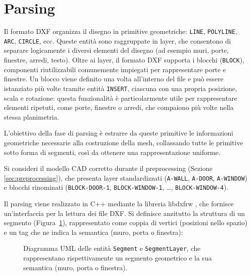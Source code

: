 \section{Parsing}
\label{sec:parsing}

Il formato DXF organizza il disegno in primitive geometriche: \texttt{LINE}, \texttt{POLYLINE}, \texttt{ARC}, \texttt{CIRCLE}, ecc. Queste entità sono raggruppate in layer, che consentono di separare logicamente i diversi elementi del disegno (ad esempio muri, porte, finestre, arredi, testo). Oltre ai layer, il formato DXF supporta i blocchi (\texttt{BLOCK}), componenti riutilizzabili comunemente impiegati per rappresentare porte e finestre. Un blocco viene definito una volta all'interno del file e può essere istanziato più volte tramite entità \texttt{INSERT}, ciascuna con una propria posizione, scala e rotazione: questa funzionalità è particolarmente utile per rappresentare elementi ripetuti, come porte, finestre o arredi, che compaiono più volte nella stessa planimetria.

L'obiettivo della fase di parsing è estrarre da queste primitive le informazioni geometriche necessarie alla costruzione della mesh, collassando tutte le primitive sotto forma di segmenti, così da ottenere una rappresentazione uniforme.

Si consideri il modello CAD corretto durante il preprocessing (Sezione \ref{sec:preprocessing}), che presenta layer standardizzati (\texttt{A-WALL}, \texttt{A-DOOR}, \texttt{A-WINDOW}) e blocchi rinominati (\texttt{BLOCK-DOOR-1}, \texttt{BLOCK-WINDOW-1}, \ldots, \texttt{BLOCK-WINDOW-4}).

Il parsing viene realizzato in C++ mediante la libreria libdxfrw \cite{libdxfrw}, che fornisce un'interfaccia per la lettura dei file DXF. Si definisce anzitutto la struttura di un segmento (Figura~\ref{fig:segment-uml}), rappresentato come coppia di vertici (posizioni nello spazio) e un tag che ne indica la semantica (muro, porta o finestra):
\begin{figure}[H]
	\centering
	
	\caption{Diagramma UML delle entità \texttt{Segment} e \texttt{SegmentLayer}, che rappresentano rispettivamente un segmento geometrico e la sua semantica (muro, porta o finestra).}
	\label{fig:segment-uml}
\end{figure}


